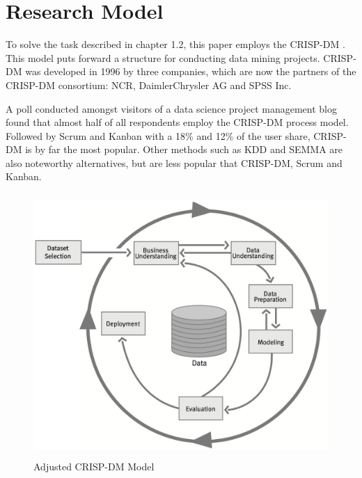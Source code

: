 \label{research-model}
\section{Research Model}

To solve the task described in chapter 1.2, this paper employs the \ac{CRISP-DM} \cite{CRISPDM2000}. This model puts forward a structure for conducting data mining projects. \ac{CRISP-DM} was developed in 1996 by three companies, which are now the partners of the \ac{CRISP-DM} consortium: NCR, DaimlerChrysler AG and SPSS Inc. 

A poll \cite{CRISPDMPopular2020} conducted amongst visitors of a data science project management blog found that almost half of all respondents employ the \ac{CRISP-DM} process model. Followed by Scrum and Kanban with a 18\% and 12\% of the user share, \ac{CRISP-DM} is by far the most popular. Other methods such as \ac{KDD} and \ac{SEMMA} are also noteworthy alternatives, but are less popular that CRISP-DM, Scrum and Kanban.

\begin{figure}[ht]
	\centering
	\includegraphics[height=10cm]{Bilder/Research_Model.png}
	\caption{Adjusted CRISP-DM Model}
	\label{fig:CRISM-DM}
\end{figure}

